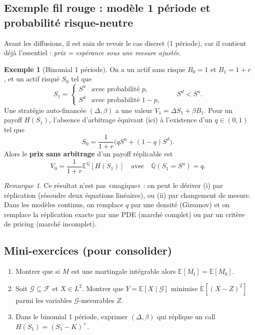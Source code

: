 \documentclass[11pt,a4paper]{report}
\theoremstyle{definition}
\newtheorem{example}{Exemple}[chapter]
\theoremstyle{plain}
\theoremstyle{remark}
\newtheorem{remark}{Remarque}[chapter]
\newcommand{\E}{\mathbb{E}}
\newcommand{\1}{\mathbf{1}}
\newcommand{\Qmeas}{\mathbb{Q}}
\newcommand{\F}{\mathcal{F}}
\newcommand{\G}{\mathcal{G}}
\begin{document}
\subsection*{Exemple fil rouge : modèle 1 période et probabilité risque-neutre}
Avant les diffusions, il est sain de revoir le cas discret (1 période), car il contient déjà l'essentiel : \emph{prix = espérance sous une mesure ajustée}.

\begin{example}[Binomial 1 période]
On a un actif sans risque $B_0=1$ et $B_1=1+r$, et un actif risqué $S_0$ tel que
\[
S_1=\begin{cases}
S^u & \text{avec probabilité } p,\\
S^d & \text{avec probabilité } 1-p,
\end{cases}
\qquad S^d<S^u.
\]
Une stratégie auto-financée $(\Delta,\beta)$ a une valeur $V_1=\Delta S_1+\beta B_1$.
Pour un payoff $H(S_1)$, l'absence d'arbitrage équivaut (ici) à l'existence d'un $q\in(0,1)$ tel que
\[
S_0=\frac{1}{1+r}\big(qS^u+(1-q)S^d\big).
\]
Alors le \textbf{prix sans arbitrage} d'un payoff réplicable est
\[
V_0=\frac{1}{1+r}\E^{\Qmeas}[H(S_1)]\quad \text{avec}\quad \Qmeas(S_1=S^u)=q.
\]
\end{example}

\begin{remark}
Ce résultat n'est pas «magique» : on peut le dériver (i) par réplication (résoudre deux équations linéaires), ou (ii) par changement de mesure.
Dans les modèles continus, on remplace $q$ par une densité (Girsanov) et on remplace la réplication exacte par une PDE (marché complet) ou par un critère de pricing (marché incomplet).
\end{remark}

\subsection*{Mini-exercices (pour consolider)}
\begin{enumerate}[leftmargin=*]
\item Montrer que si $M$ est une martingale intégrable alors $\E[M_t]=\E[M_0]$.
\item Soit $\G\subseteq\F$ et $X\in L^2$. Montrer que $Y=\E[X\mid \G]$ minimise $\E[(X-Z)^2]$ parmi les variables $\G$-mesurables $Z$.
\item Dans le binomial 1 période, exprimer $(\Delta,\beta)$ qui réplique un call $H(S_1)=(S_1-K)^+$.
\end{enumerate}
\end{document}
